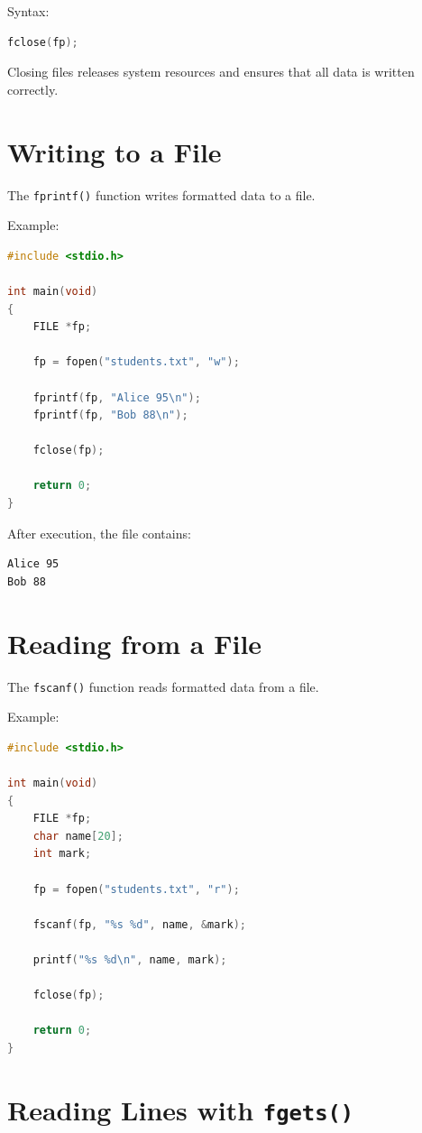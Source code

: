 \documentclass[12pt,openany]{book}
\begin{document}
Syntax:

\begin{lstlisting}[language=C]
fclose(fp);
\end{lstlisting}

Closing files releases system resources and ensures that all data is written correctly.

\section{Writing to a File}

The \texttt{fprintf()} function writes formatted data to a file.

Example:

\begin{lstlisting}[language=C]
#include <stdio.h>

int main(void)
{
    FILE *fp;

    fp = fopen("students.txt", "w");

    fprintf(fp, "Alice 95\n");
    fprintf(fp, "Bob 88\n");

    fclose(fp);

    return 0;
}
\end{lstlisting}

After execution, the file contains:

\begin{lstlisting}
Alice 95
Bob 88
\end{lstlisting}

\section{Reading from a File}

The \texttt{fscanf()} function reads formatted data from a file.

Example:

\begin{lstlisting}[language=C]
#include <stdio.h>

int main(void)
{
    FILE *fp;
    char name[20];
    int mark;

    fp = fopen("students.txt", "r");

    fscanf(fp, "%s %d", name, &mark);

    printf("%s %d\n", name, mark);

    fclose(fp);

    return 0;
}
\end{lstlisting}
\section{Reading Lines with \texttt{fgets()}}
\end{document}

